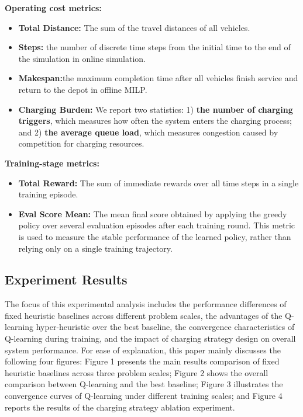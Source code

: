 \noindent \textbf{Operating cost metrics:}
\begin{itemize}
    \item \textbf{Total Distance:} The sum of the travel distances of all vehicles.
    
    \item \textbf{Steps:} the number of discrete time steps from the initial time to the end of the simulation in online simulation. 
    \item \textbf{Makespan:}the maximum completion time after all vehicles finish service and return to the depot in offline MILP.
    \item \textbf{Charging Burden:} We report two statistics: 1) \textbf{the number of charging triggers}, which measures how often the system enters the charging process; and 2) \textbf{the average queue load}, which measures congestion caused by competition for charging resources.
\end{itemize}

\noindent \textbf{Training-stage metrics:}
\begin{itemize}
    \item \textbf{Total Reward:} The sum of immediate rewards over all time steps in a single training episode.
    \item \textbf{Eval Score Mean:} The mean final score obtained by applying the greedy policy over several evaluation episodes after each training round. This metric is used to measure the stable performance of the learned policy, rather than relying only on a single training trajectory.
\end{itemize}

\subsection{Experiment Results}
The focus of this experimental analysis includes the performance differences of fixed heuristic baselines across different problem scales, the advantages of the Q-learning hyper-heuristic over the best baseline, the convergence characteristics of Q-learning during training, and the impact of charging strategy design on overall system performance. For ease of explanation, this paper mainly discusses the following four figures: Figure 1 presents the main results comparison of fixed heuristic baselines across three problem scales; Figure 2 shows the overall comparison between Q-learning and the best baseline; Figure 3 illustrates the convergence curves of Q-learning under different training scales; and Figure 4 reports the results of the charging strategy ablation experiment.
